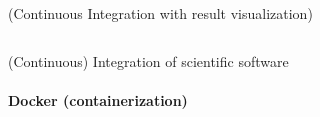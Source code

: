 \begin{frame}{(Continuous Integration with result visualization)}
\begin{columns}
\begin{column}[c]{0.6\textwidth}
\begin{itemize}
            \end{itemize}
        \end{column}
    \end{columns}
\end{frame}

\begin{frame}{(Continuous) Integration of scientific software} 
    \framesubtitle{Docker (containerization)}
    \vfill

    \begin{columns}
        \begin{column}[c]{0.4\textwidth}
            \begin{center}
            \end{center}

\end{column}
\end{columns}
\end{frame}
